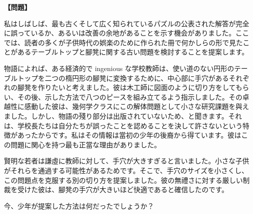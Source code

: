 \documentclass[10pt,a4paper,oneside,openany]{ltjsbook}
\begin{document}
\begin{tcolorbox}[colback=softblue,colframe=primaryblue,title=\textbf{第 157 問：THE TABLE-TOP AND STOOLS.},arc=2mm,boxrule=1pt,breakable]
\textbf{【問題】}\par\vspace{0.3em}
私はしばしば、最も古くそして広く知られているパズルの公表された解答が完全に誤っているか、あるいは改善の余地があることを示す機会がありました。ここでは、読者の多くが子供時代の娯楽のために作られた冊で何かしらの形で見たことがあるテーブルトップと腳凳に関する古い問題を検討することを提案します。

物語によれば、ある経済的で ingenious な学校教師は、使い道のない円形のテーブルトップを二つの楕円形の腳凳に変換するために、中心部に手穴があるそれぞれの腳凳を作りたいと考えました。彼は木工師に図面のように切り方をしてもらい、その後、示した方法で八つのピースを組み立てるよう指示しました。その卓越性に感動した彼は、幾何学クラスにこの解体問題として小さな研究課題を與えました。しかし、物語の殘り部分は出版されていないため、と聞きます。それは、学校長たちは自分たちが誤ったことを認めることを決して許さないという特徴があったからです。私はその情報は當初の少年の後裔から得ています。彼はこの問題に関心を持つ最も正當な理由がありました。

賢明な若者は謙虛に教師に対して、手穴が大きすぎると言いました。小さな子供がそれらを通過する可能性があるためです。そこで、手穴のサイズを小さくし、この問題点を克服する別の切り方を提案しました。彼の無禮さに対する厳しい制裁を受けた彼は、腳凳の手穴が大きいほど快適であると確信したのです。

今、少年が提案した方法は何だったでしょうか？


\end{tcolorbox}
\end{document}
